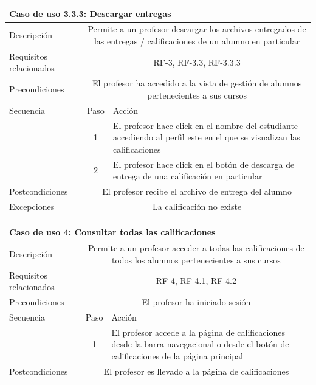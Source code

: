 \begin{adjustwidth}{-2cm}{}
\begin{tabular}[H]{l c l}
\toprule 
\multicolumn{3}{l}{\textbf{Caso de uso 3.3.3: Descargar entregas}}\\
\midrule
Descripción & \multicolumn{2}{p{10cm}}{Permite a un profesor descargar los archivos entregados de las entregas / calificaciones de un alumno en particular}\\
\midrule
Requisitos relacionados & \multicolumn{2}{p{10cm}}{RF-3, RF-3.3, RF-3.3.3}\\
\midrule
Precondiciones & \multicolumn{2}{p{10cm}}{El profesor ha accedido a la vista de gestión de alumnos pertenecientes a sus cursos}\\
\midrule
Secuencia & Paso & Acción \\
\cmidrule{2-3}
         & 1 &  \multicolumn{1}{p{8cm}}{El profesor hace click en el nombre del estudiante accediendo al perfil este en el que se visualizan las calificaciones}\\
         & 2 &  \multicolumn{1}{p{8cm}}{El profesor hace click en el botón de descarga de entrega de una calificación en particular}\\

\midrule
Postcondiciones & \multicolumn{2}{p{10cm}}{El profesor recibe el archivo de entrega del alumno}\\
\midrule
Excepciones & \multicolumn{2}{p{10cm}}{La calificación no existe}\\
\bottomrule 
\end{tabular}

\hspace{3cm} 

\begin{tabular}[H]{l c l}
\toprule 
\multicolumn{3}{l}{\textbf{Caso de uso 4: Consultar todas las calificaciones}}\\
\midrule
Descripción & \multicolumn{2}{p{10cm}}{Permite a un profesor acceder a todas las calificaciones de todos los alumnos pertenecientes a sus cursos}\\
\midrule
Requisitos relacionados & \multicolumn{2}{p{10cm}}{RF-4, RF-4.1, RF-4.2}\\
\midrule
Precondiciones & \multicolumn{2}{p{10cm}}{El profesor ha iniciado sesión}\\
\midrule
Secuencia & Paso & Acción \\
\cmidrule{2-3}
         & 1 & \multicolumn{1}{p{8cm}}{El profesor accede a la página de calificaciones desde la barra navegacional o desde el botón de calificaciones de la página principal} \\
\midrule
Postcondiciones & \multicolumn{2}{p{10cm}}{El profesor es llevado a la página de calificaciones}\\
\bottomrule 
\end{tabular}
\end{adjustwidth}


